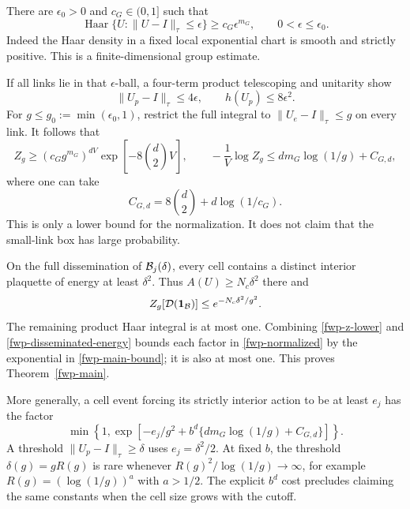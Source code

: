 There are \(\epsilon_0>0\) and \(c_G\in(0,1]\) such that
\begin{equation}
 \operatorname{Haar}\{U:\|U-I\|_\tau\le\epsilon\}
       \ge c_G\epsilon^{m_G},\qquad 0<\epsilon\le\epsilon_0.
 \label{fwp-haar-ball}
\end{equation}
Indeed the Haar density in a fixed local exponential chart is smooth
and strictly positive. This is a finite-dimensional group estimate.

If all links lie in that \(\epsilon\)-ball, a four-term product
telescoping and unitarity show
\[
 \|U_p-I\|_\tau\le4\epsilon,\qquad h(U_p)\le8\epsilon^2.
\]
For \(g\le g_0:=\min(\epsilon_0,1)\), restrict the full integral to
\(\|U_e-I\|_\tau\le g\) on every link. It follows that
\begin{equation}
 Z_g\ge(c_Gg^{m_G})^{dV}
             \exp\!\left[-8\binom d2V\right],
 \qquad
 -\frac1V\log Z_g
       \le d m_G\log(1/g)+C_{G,d},
 \label{fwp-z-lower}
\end{equation}
where one can take
\[
 C_{G,d}=8\binom d2+d\log(1/c_G).
\]
This is only a lower bound for the normalization. It does not claim
that the small-link box has large probability.

On the full dissemination of \({\cal B}_j(\delta)\), every cell
contains a distinct interior plaquette of energy at least \(\delta^2\).
Thus \(A(U)\ge N_c\delta^2\) there and
\begin{equation}
 Z_g[{\cal D}(\mathbf1_{\cal B})]
       \le e^{-N_c\delta^2/g^2}.
 \label{fwp-disseminated-energy}
\end{equation}
The remaining product Haar integral is at most one.
Combining \eqref{fwp-z-lower} and \eqref{fwp-disseminated-energy}
bounds each factor in \eqref{fwp-normalized} by the exponential in
\eqref{fwp-main-bound}; it is also at most one.
This proves Theorem~\ref{fwp-main}.

More generally, a cell event forcing its strictly interior action to be
at least \(e_j\) has the factor
\begin{equation}
 \min\left\{1,\exp\left[-e_j/g^2
              +b^d\{d m_G\log(1/g)+C_{G,d}\}\right]\right\}.
 \label{fwp-energy-general}
\end{equation}
A threshold \(\|U_p-I\|_\tau\ge\delta\) uses \(e_j=\delta^2/2\).
At fixed \(b\), the threshold \(\delta(g)=gR(g)\) is rare whenever
\(R(g)^2/\log(1/g)\to\infty\), for example
\(R(g)=(\log(1/g))^a\) with \(a>1/2\).
The explicit \(b^d\) cost precludes claiming the same constants when
the cell size grows with the cutoff.

